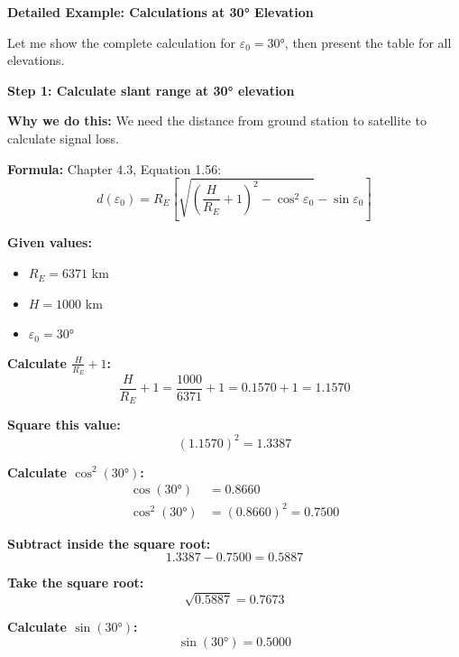\documentclass[11pt,letterpaper]{article}
\begin{document}
\vspace{0.3cm}

\textbf{Detailed Example: Calculations at 30° Elevation}

Let me show the complete calculation for $\varepsilon_0 = 30°$, then present the table for all elevations.

\vspace{0.2cm}

\textbf{Step 1: Calculate slant range at 30° elevation}

\textbf{Why we do this:} We need the distance from ground station to satellite to calculate signal loss.

\textbf{Formula:} Chapter 4.3, Equation 1.56:
\begin{equation}
d(\varepsilon_0) = R_E \left[\sqrt{\left(\frac{H}{R_E} + 1\right)^2 - \cos^2 \varepsilon_0} - \sin \varepsilon_0\right]
\end{equation}

\textbf{Given values:}
\begin{itemize}
    \item $R_E = 6371$ km
    \item $H = 1000$ km
    \item $\varepsilon_0 = 30°$
\end{itemize}

\textbf{Calculate $\frac{H}{R_E} + 1$:}
\begin{equation}
\frac{H}{R_E} + 1 = \frac{1000}{6371} + 1 = 0.1570 + 1 = 1.1570
\end{equation}

\textbf{Square this value:}
\begin{equation}
(1.1570)^2 = 1.3387
\end{equation}

\textbf{Calculate $\cos^2(30°)$:}
\begin{align}
\cos(30°) &= 0.8660 \\
\cos^2(30°) &= (0.8660)^2 = 0.7500
\end{align}

\textbf{Subtract inside the square root:}
\begin{equation}
1.3387 - 0.7500 = 0.5887
\end{equation}

\textbf{Take the square root:}
\begin{equation}
\sqrt{0.5887} = 0.7673
\end{equation}

\textbf{Calculate $\sin(30°)$:}
\begin{equation}
\sin(30°) = 0.5000
\end{equation}
\end{document}
